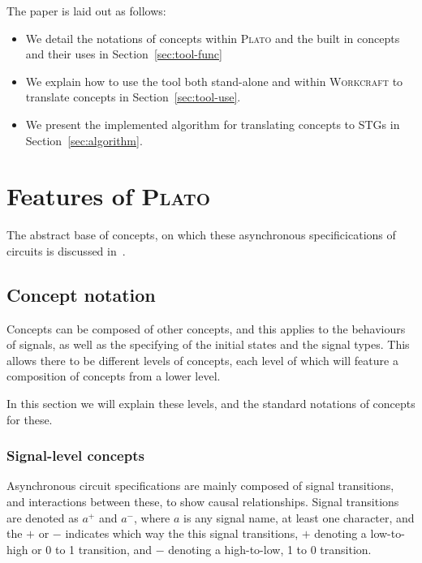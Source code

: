 \documentclass[british,conference,compsoc]{IEEEtran}
\newcommand{\noun}[1]{\textsc{#1}}
\begin{document}
The paper is laid out as follows:
\vspace{-1mm}
\begin{itemize}
  \item We detail the notations of concepts within \noun{Plato} and the built in
  concepts and their uses in Section~\ref{sec:tool-func}
  \item We explain how to use the tool both stand-alone and within
  \noun{Workcraft} to translate concepts in Section~\ref{sec:tool-use}.
  \item We present the implemented algorithm for translating concepts to STGs
  in Section~\ref{sec:algorithm}.
\end{itemize}

\section{Features of \noun{Plato}\label{sec:tool-func}}

\vspace{-3mm}

The abstract base of concepts, on which these asynchronous specificications of 
circuits is discussed in~\cite{2015_Beaumont_MEMOCODE}.

\vspace{-3mm}

\subsection{Concept notation \label{sub:concept-notation}}

\vspace{-3mm}

Concepts can be composed of other concepts, and this applies to the behaviours 
of signals, as well as the specifying of the initial states and the signal 
types. This allows there to be different levels of concepts, each level of 
which will feature a composition of concepts from a lower level. 

In this section we will explain these levels, and the standard notations of 
concepts for these. 

\vspace{-2mm}

\subsubsection{\label{signal-level}Signal-level concepts}Asynchronous circuit 
specifications are mainly composed of signal transitions, and interactions 
between these, to show causal relationships. Signal transitions are denoted as 
$a^{+}$ and $a^{-}$, where $a$ is any signal name, at least one character, and 
the $+$ or $-$ indicates which way the this signal transitions, $+$ denoting a 
low-to-high or 0 to 1 transition, and $-$ denoting a high-to-low, 1 to 0 
transition. 
\end{document}
